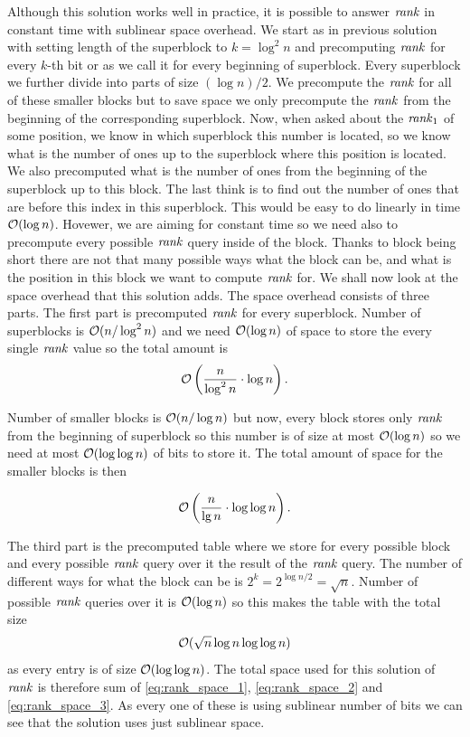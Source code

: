 Although this solution works well in practice, it is possible to answer $\mathit{rank}$ in constant time
with sublinear space overhead. We start as in previous solution with setting length of the
superblock to $k=\log^2 n$ and precomputing $\mathit{rank}$ for every $k$-th bit or as we call it for
every beginning of superblock. Every superblock we further divide into parts of size $(\log n)/2$.
We precompute the $\mathit{rank}$ for all of these smaller blocks but to save space we only precompute the
$\mathit{rank}$ from the beginning of the corresponding superblock. Now, when asked about the $\mathit{rank}_1$ of
some position, we know in which superblock this number is located, so we know what is the number
of ones up to the superblock where this position is located. We also precomputed what is the
number of ones from the beginning of the superblock up to this block. The last think is to
find out the number of ones that are before this index in this superblock. This would be easy
to do linearly in time $\mathcal{O}(\log n)$. Hovewer, we are aiming for constant time so we need
also to precompute every possible $\mathit{rank}$ query inside of the block. Thanks to block being short
there are not that many possible ways what the block can be, and what is the position in this
block we want to compute $\mathit{rank}$ for. We shall now look at the space overhead that this solution
adds. The space overhead consists of three parts. The first part is precomputed $\mathit{rank}$ for
every superblock. Number of superblocks is $\mathcal{O}(n/\log^2 n)$ and we need $\mathcal{O}(\log n)$
of space to store the every single $\mathit{rank}$ value so the total amount is
\begin{equation}
    \mathcal{O}\left(\frac{n}{\log^2 n}\cdot \log n\right).
    \label{eq:rank_space_1}
\end{equation}

Number of smaller blocks is $\mathcal{O}(n/\log n)$ but now, every block stores only $\mathit{rank}$
from the beginning of superblock so this number is of size at most $\mathcal{O}(\log n)$ so we need
at most $\mathcal{O}(\log\log n)$ of bits to store it. The total amount of space for the smaller
blocks is then

\begin{equation}
    \mathcal{O}\left(\frac{n}{\lg n}\cdot \log\log n\right).
    \label{eq:rank_space_2}
\end{equation}

The third part is the precomputed table where we store for every possible block and every
possible $\mathit{rank}$ query over it the result of the $\mathit{rank}$ query. The number of different ways for
what the block can be is $2^{k} = 2^{\log n/2} = \sqrt{n}$. Number of possible $\mathit{rank}$ queries
over it is $\mathcal{O}(\log n)$ so this makes the table with the total size 
\begin{equation}
    \mathcal{O}(\sqrt{n}\log n\log\log n)
    \label{eq:rank_space_3}
\end{equation}
as every entry is of size $\mathcal{O}(\log\log n)$. The total space used for this solution of $\mathit{rank}$
is therefore sum of \ref{eq:rank_space_1}, \ref{eq:rank_space_2} and \ref{eq:rank_space_3}.
As every one of these is using sublinear number of bits we can see that the solution uses just
sublinear space.

